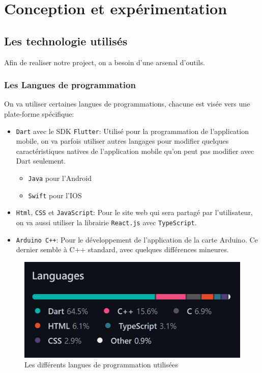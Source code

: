 \chapter{Conception et expérimentation}

\section{Les technologie utilisés}

Afin de realiser notre project, on a besoin d'une arsenal d'outils. \\

\subsection{Les Langues de programmation}
On va utiliser certaines langues de programmations, chacune est visée vers une plate-forme spécifique:
\begin{itemize}
    \item \verb|Dart| avec le \acrshort{SDK} \verb|Flutter|: Utilisé pour la programmation de l'application mobile, on va parfois utiliser autres langages pour modifier quelques caractéristiques natives de l'application mobile qu'on peut pas modifier avec Dart seulement.
    \begin{itemize}
        \item \verb|Java| pour l'Android
        \item \verb|Swift| pour l'IOS
    \end{itemize}
    \item \verb|Html|, \verb|CSS| et \verb|JavaScript|: Pour le site web qui sera partagé par l'utilisateur, on va aussi utiliser la librairie \verb|React.js| avec \verb|TypeScript|.
    \item \verb|Arduino C++|: Pour le développement de l'application de la carte Arduino. Ce dernier semble à C++ standard, avec quelques différences mineures.
\end{itemize}

\begin{figure}[!htbp]
    \centering
    \includegraphics[width=.7\linewidth]{assets/used languages.png}
    \caption{Les différents langues de programmation utilisées}
\end{figure}

